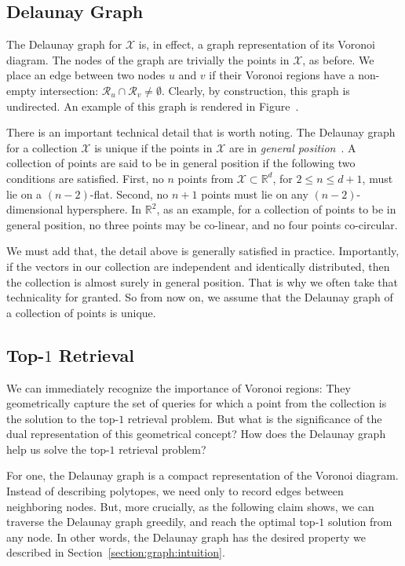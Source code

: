 \subsection{Delaunay Graph}

The Delaunay graph for $\mathcal{X}$ is, in effect, a graph representation of its
Voronoi diagram.
The nodes of the graph are trivially the points in $\mathcal{X}$, as before.
We place an edge between two nodes $u$ and $v$ if their Voronoi regions have a non-empty
intersection: $\mathcal{R}_u \cap \mathcal{R}_v \neq \emptyset$. Clearly, by construction,
this graph is undirected. An example
of this graph is rendered in Figure~.

\medskip 

There is an important technical detail that is worth noting.
The Delaunay graph for a collection $\mathcal{X}$ is unique if the points
in $\mathcal{X}$ are in \emph{general position}~\citep{fortune1997voronoi}.
A collection of points are said to be in general position if the following two
conditions are satisfied. First, no $n$ points from $\mathcal{X} \subset \mathbb{R}^d$,
for $2 \leq n \leq d + 1$, must lie on a $(n-2)$-flat. Second, no $n+1$ points
must lie on any $(n-2)$-dimensional hypersphere. In $\mathbb{R}^2$, as an example,
for a collection of points to be in general position,
no three points may be co-linear, and no four points co-circular.

We must add that, the detail above is generally satisfied in practice.
Importantly, if the vectors in our collection are
independent and identically distributed, then the collection is almost surely in general
position. That is why we often take that technicality for granted.
So from now on, we assume that the Delaunay graph of a collection of points is unique.

\subsection{Top-\texorpdfstring{$1$}{1} Retrieval}
We can immediately recognize the importance of Voronoi regions: They geometrically
capture the set of queries for which a point from the collection is the solution
to the top-$1$ retrieval problem. But what is the significance of the dual representation
of this geometrical concept? How does the Delaunay graph help us solve the top-$1$
retrieval problem?

For one, the Delaunay graph is a compact representation of the Voronoi diagram.
Instead of describing polytopes, we need only to record edges between neighboring nodes.
But, more crucially, as the following claim shows, we can traverse the Delaunay graph greedily,
and reach the optimal top-$1$ solution from any node. In other words, the Delaunay graph
has the desired property we described in Section~\ref{section:graph:intuition}.

